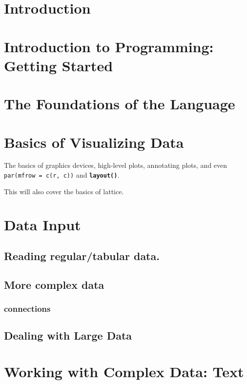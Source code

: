 \documentclass[11pt]{book}
\def\Rfunc#1{\textbf{\texttt{#1()}}}
\def\Rcode#1{\texttt{#1}}
\begin{document}
\tableofcontents
\pagebreak



\chapter{Introduction}

\chapter{Introduction to Programming:  Getting Started}

\chapter{The Foundations of the Language}

%

\chapter{Basics of Visualizing Data}
The basics of graphics devices, high-level plots,
annotating plots, and even 
\Rcode{par(mfrow = c(r, c))} and 
\Rfunc{layout}.

This will also  cover the basics of lattice.

\chapter{Data Input}
\section{Reading regular/tabular data.}
\section{More complex data}
\subsection{connections}
\section{Dealing with Large Data}

\chapter{Working with Complex Data: Text}
\end{document}
